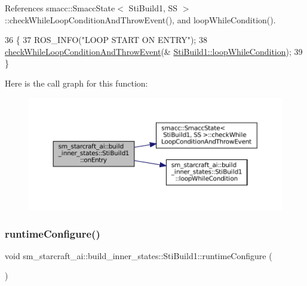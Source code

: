 References smacc\+::\+Smacc\+State$<$ Sti\+Build1, S\+S $>$\+::check\+While\+Loop\+Condition\+And\+Throw\+Event(), and loop\+While\+Condition().


\begin{DoxyCode}
36   \{
37     ROS\_INFO(\textcolor{stringliteral}{"LOOP START ON ENTRY"});
38     \hyperlink{classsmacc_1_1SmaccState_a80082718f226bebedb589f0c4696001d}{checkWhileLoopConditionAndThrowEvent}(&
      \hyperlink{structsm__starcraft__ai_1_1build__inner__states_1_1StiBuild1_a26ccf2930308213ae74751d6b2f5813a}{StiBuild1::loopWhileCondition});
39   \}
\end{DoxyCode}
Here is the call graph for this function\+:
\nopagebreak
\begin{figure}[H]
\begin{center}
\leavevmode
\includegraphics[width=350pt]{structsm__starcraft__ai_1_1build__inner__states_1_1StiBuild1_a699277580164547c939b525a17dc01ec_cgraph}
\end{center}
\end{figure}
\mbox{\label{structsm__starcraft__ai_1_1build__inner__states_1_1StiBuild1_af9d35c64cffb6a3a117a00c6b77a8ab0}} 
\subsubsection{\texorpdfstring{runtime\+Configure()}{runtimeConfigure()}}
{\footnotesize\ttfamily void sm\+\_\+starcraft\+\_\+ai\+::build\+\_\+inner\+\_\+states\+::\+Sti\+Build1\+::runtime\+Configure (\begin{DoxyParamCaption}{ }\end{DoxyParamCaption})\hspace{0.3cm}{\ttfamily [inline]}}



